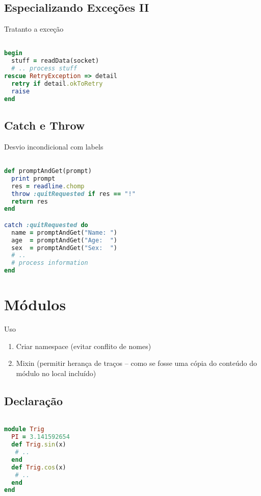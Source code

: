 \documentclass[serif,mathserif]{article}
\begin{document}
\subsection{Especializando Exceções II}

Tratanto a exceção

\begin{lstlisting}[language=ruby]

begin
  stuff = readData(socket)
  # .. process stuff
rescue RetryException => detail
  retry if detail.okToRetry
  raise
end
\end{lstlisting}

\subsection{Catch e Throw}

Desvio incondicional com labels

\begin{lstlisting}[language=ruby]

def promptAndGet(prompt)
  print prompt
  res = readline.chomp
  throw :quitRequested if res == "!"
  return res
end

catch :quitRequested do
  name = promptAndGet("Name: ")
  age  = promptAndGet("Age:  ")
  sex  = promptAndGet("Sex:  ")
  # ..
  # process information
end
\end{lstlisting}

\section{Módulos}
Uso

\begin{enumerate}
  \item Criar namespace (evitar conflito de nomes)
  \item Mixin (permitir herança de traços – como se fosse uma cópia do conteúdo do módulo no local incluído)
\end{enumerate}

\subsection{Declaração}

\begin{lstlisting}[language=ruby]

module Trig
  PI = 3.141592654
  def Trig.sin(x)
   # ..
  end
  def Trig.cos(x)
   # ..
  end
end
\end{lstlisting}
\end{document}
